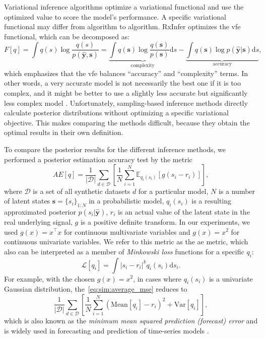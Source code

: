Variational inference algorithms optimize a variational functional and use the optimized value
to score the model's performance.
A specific variational functional may differ from algorithm to algorithm. RxInfer optimizes the \ac{vfe} functional, 
which can be decomposed as:
\begin{equation}
    F[q] = \int q(s) \log\frac{q(s)}{p(\hat{\bm{y}}, \bm{s})} = \underbrace{\int q(\bm{s}) \log\frac{q(\bm{s})}{p(\bm{s})}\mathrm{d}s}_{\mathrm{complexity}} - \underbrace{\int q(\bm{s})\log p(\hat{\bm{y}}\vert \bm{s})\mathrm{d}s}_{\mathrm{accuracy}},
\end{equation}
which emphasizes that the \ac{vfe} balances ``accuracy'' and ``complexity'' terms. In other words, a very accurate model is not
necessarily the best one if it is too complex, and it might be better to use a slightly less accurate but significantly less complex model \citep{friston_free-energy_2009}. Unfortunately, sampling-based inference methods directly calculate posterior distributions without optimizing a specific variational objective. This makes comparing the methods difficult, because they obtain the optimal results in their own definition.

To compare the posterior results for the different inference methods, we performed a posterior
estimation accuracy test by the metric \begin{equation}
  \label{eq:sim:average_mse} AE[q] =
  \frac{1}{\vert \mathcal{D}\vert }\sum_{d \in \mathcal{D}} \left[\frac{1}{N}\sum_{i = 1}^{N}
    \mathbb{E}_{q_i(s_i)}[g(s_i - r_i)]\right],
\end{equation} where $\mathcal{D}$ is a set of
all synthetic datasets $d$ for a particular model, $N$ is a number of latent states $\bm{s} =
  \{ s_i\}_{1:N}$ in a probabilistic model, $q_i(s_i)$ is a resulting approximated posterior
$p(s_i\vert \hat{\bm{y}})$, $r_i$ is an actual value of the latent state in the real underlying
signal, $g$ is a positive definite transform.
In our experiments, we used $g(x) = x^\intercal x$ for continuous multivariate variables and $g(x) = x^2$ for continuous univariate variables.
We refer to this metric as the \ac{ae} metric, which also can be interpreted as a member of \textit{Minkowski loss} functions \citep[Ch. 1]{bishop_pattern_2006} for a specific $q_i$:
\begin{equation}
    \mathcal{L}\left[q_i\right] = \int | s_i - r_i |^k q_i(s_i) \mathrm{d}s_i.
\end{equation}
For example, with the chosen $g(x) = x^2$, in cases where $q_i(s_i)$ is a univariate Gaussian distribution, the~\eqref{eq:sim:average_mse} reduces to 
\begin{equation}
\frac{1}{\vert \mathcal{D}\vert }\sum_{d \in \mathcal{D}} \left[\frac{1}{N}\sum_{i = 1}^{N}
    (\mathrm{Mean}\!\left[q_i\right]- r_i)^2 + \mathrm{Var}\!\left[q_i\right]\right],
\end{equation}
which is also known as the \textit{minimum mean squared prediction (forecast) error} and is widely used in forecasting and prediction of time-series models \citep[Chapter~18]{pindyck_econometric_1998}.


